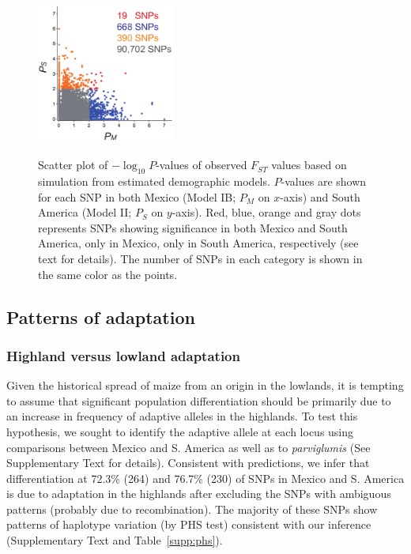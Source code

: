 \begin{figure}[tb]   
  \begin{center}
   \vspace{-0mm}
   \includegraphics[width=0.4\textwidth]{fig/Fig6}
   \renewcommand{\baselinestretch}{0.9}
   \vspace{-3mm}
   \caption{Scatter plot of $-\log_10 P$-values of observed $F_{ST}$ values based on simulation from estimated demographic models. $P$-values are shown for each SNP in both Mexico (Model IB; $P_M$ on $x$-axis) and South America (Model II; $P_S$ on $y$-axis).  
   Red, blue, orange and gray dots represents SNPs showing significance in both Mexico and South America, only in Mexico, only in South America, respectively (see text for details).
   The number of SNPs in each category is shown in the same color as the points.} 
\vspace{-6mm}
    \label{PvDist}
  \end{center}
\end{figure}
%

\subsection*{Patterns of adaptation}

\subsubsection{Highland versus lowland adaptation}  

Given the historical spread of maize from an origin in the lowlands, it is tempting to assume that significant population differentiation should be primarily due to an increase in frequency of adaptive alleles in the highlands.
To test this hypothesis, we sought to identify the adaptive allele at each locus using comparisons between Mexico and S. America as well as to \emph{parviglumis} (See Supplementary Text  for details).  
Consistent with predictions, we infer that differentiation at 72.3\% (264) and 76.7\% (230) of SNPs in Mexico and S. America is due to adaptation in the highlands after excluding the SNPs with ambiguous patterns (probably due to recombination). 
The majority of these SNPs show patterns of haplotype variation (by PHS test) consistent with our inference (Supplementary Text and Table~\ref{supp:phs}).


